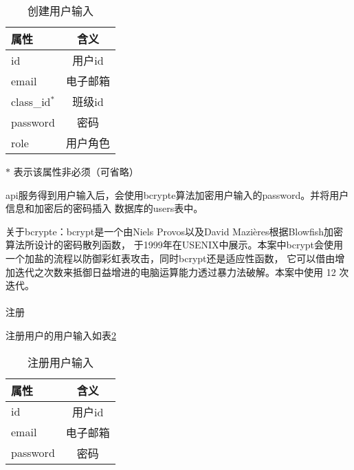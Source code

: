 \begin{table}[htpb!]
    \centering
    \caption{\label{user_in}创建用户输入}
    \begin{threeparttable}
        \begin{tabular}{lc}
            \toprule
            属性          & 含义     \\
            \midrule
            id            & 用户id   \\
            email         & 电子邮箱 \\
            class\_id$^*$ & 班级id   \\
            password      & 密码     \\
            role          & 用户角色 \\
            \bottomrule
        \end{tabular}
        \begin{tablenotes}
            \footnotesize
            \item[$*$] 表示该属性非必须（可省略）
        \end{tablenotes}
    \end{threeparttable}
\end{table}

api服务得到用户输入后，会使用bcrypte算法加密用户输入的password。并将用户信息和加密后的密码插入
数据库的users表中。

关于bcrypte：bcrypt是一个由Niels Provos以及David Mazières根据Blowfish加密算法所设计的密码散列函数，
于1999年在USENIX中展示\cite{bycrypto}。本案中bcrypt会使用一个加盐的流程以防御彩虹表攻击，同时bcrypt还是适应性函数，
它可以借由增加迭代之次数来抵御日益增进的电脑运算能力透过暴力法破解。本案中使用 12 次迭代。

\paragraph{}注册

注册用户的用户输入如表\ref{sign_up_in}
\begin{table}[htpb!]
    \centering
    \caption{\label{sign_up_in}注册用户输入}
    \begin{threeparttable}
        \begin{tabular}{lc}
            \toprule
            属性     & 含义     \\
            \midrule
            id       & 用户id   \\
            email    & 电子邮箱 \\
            password & 密码     \\
            \bottomrule
        \end{tabular}
    \end{threeparttable}
\end{table}

